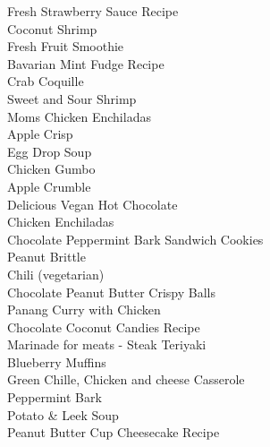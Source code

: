 \documentclass[11pt, twoside, openany]{book}
\begin{document}
Fresh Strawberry Sauce Recipe\hrulefill\pageref{fresh-strawberry-sauce-recipe}\\
Coconut Shrimp\hrulefill\pageref{coconut-shrimp}\\
Fresh Fruit Smoothie\hrulefill\pageref{fresh-fruit-smoothie}\\
Bavarian Mint Fudge Recipe\hrulefill\pageref{bavarian-mint-fudge-recipe}\\
Crab Coquille\hrulefill\pageref{crab-coquille}\\
Sweet and Sour Shrimp\hrulefill\pageref{sweet-and-sour-shrimp}\\
Moms Chicken Enchiladas\hrulefill\pageref{moms-chicken-enchiladas}\\
Apple Crisp\hrulefill\pageref{apple-crisp}\\
Egg Drop Soup\hrulefill\pageref{egg-drop-soup}\\
Chicken Gumbo\hrulefill\pageref{chicken-gumbo}\\
Apple Crumble\hrulefill\pageref{apple-crumble}\\
Delicious Vegan Hot Chocolate\hrulefill\pageref{delicious-vegan-hot-chocolate}\\
Chicken Enchiladas\hrulefill\pageref{chicken-enchiladas}\\
Chocolate Peppermint Bark Sandwich Cookies\hrulefill\pageref{chocolate-peppermint-bark-sandwich-cookies}\\
Peanut Brittle\hrulefill\pageref{peanut-brittle}\\
Chili (vegetarian)\hrulefill\pageref{chili-(vegetarian)}\\
Chocolate Peanut Butter Crispy Balls\hrulefill\pageref{chocolate-peanut-butter-crispy-balls}\\
Panang Curry with Chicken\hrulefill\pageref{panang-curry-with-chicken}\\
Chocolate Coconut Candies Recipe\hrulefill\pageref{chocolate-coconut-candies-recipe}\\
Marinade for meats - Steak Teriyaki\hrulefill\pageref{marinade-for-meats---steak-teriyaki}\\
Blueberry Muffins\hrulefill\pageref{blueberry-muffins}\\
Green Chille, Chicken and cheese Casserole\hrulefill\pageref{green-chille,-chicken-and-cheese-casserole}\\
Peppermint Bark\hrulefill\pageref{peppermint-bark}\\
Potato & Leek Soup\hrulefill\pageref{potato-&-leek-soup}\\
Peanut Butter Cup Cheesecake Recipe\hrulefill\pageref{peanut-butter-cup-cheesecake-recipe}\\
\end{document}
